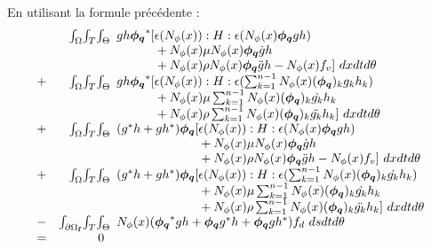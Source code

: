 En utilisant la formule précédente :
\begin{equation}
\begin{array}{r r l}
	&\int_\Omega \! \int_T \! \int_\Theta \!\!\!&		
		gh\boldsymbol{\phi_q}^*[\epsilon (N_\phi(x)) : H : \epsilon (N_\phi(x)\boldsymbol{\phi_q} gh)
			\\ && \phantom{gh\boldsymbol{\phi_q}^*[ }
			+ N_\phi(x) \mu  N_\phi(x) \boldsymbol{\phi_q}  \dot{g}h
			\\ && \phantom{gh\boldsymbol{\phi_q}^*[ }
			+ N_\phi(x) \rho N_\phi(x) \boldsymbol{\phi_q} \ddot{g}h
			- N_\phi(x) f_v
			] ~dx dt d\theta
	\\
	+ &\int_\Omega \! \int_T \! \int_\Theta \!\!\!&		
		gh\boldsymbol{\phi_q}^*[\epsilon (N_\phi(x)) : H : 
				\epsilon (\sum_{k=1}^{n-1} N_\phi(x)(\boldsymbol{\phi_q})_k g_k h_k)
			\\ && \phantom{gh\boldsymbol{\phi_q}^*[}
			+ N_\phi(x) \mu \sum_{k=1}^{n-1} N_\phi(x)(\boldsymbol{\phi_q})_k \dot{g_k} h_k 
			\\ && \phantom{gh\boldsymbol{\phi_q}^*[}
			+ N_\phi(x) \rho \sum_{k=1}^{n-1} N_\phi(x)(\boldsymbol{\phi_q})_k \ddot{g_k} h_k 
			] ~dx dt d\theta
	\\
	+ &\int_\Omega \! \int_T \! \int_\Theta \!\!\!&		
		(g^*h + gh^*)\boldsymbol{\phi_q}[\epsilon (N_\phi(x)) : H : \epsilon (N_\phi(x) \boldsymbol{\phi_q}gh)
			\\ && \phantom{(g^*h + gh^*)\boldsymbol{\phi_q}[ }
			+ N_\phi(x) \mu  N_\phi(x) \boldsymbol{\phi_q} \dot{g}h
			\\ && \phantom{(g^*h + gh^*)\boldsymbol{\phi_q}[ }
			 + N_\phi(x) \rho N_\phi(x) \boldsymbol{\phi_q} \ddot{g}h
			- N_\phi(x) f_v
			] ~dx dt d\theta
	\\
	+ &\int_\Omega \! \int_T \! \int_\Theta \!\!\!&
		(g^*h + gh^*)\boldsymbol{\phi_q}[\epsilon (N_\phi(x)) : H : 
					\epsilon (\sum_{k=1}^{n-1} N_\phi(x)(\boldsymbol{\phi_q})_k \dot{g_k} h_k )
			\\ && \phantom{(g^*h + gh^*)\boldsymbol{\phi_q}[}
			+ N_\phi(x) \mu \sum_{k=1}^{n-1} N_\phi(x)(\boldsymbol{\phi_q})_k \dot{g_k} h_k 
			\\ && \phantom{(g^*h + gh^*)\boldsymbol{\phi_q}[}
			+ N_\phi(x) \rho \sum_{k=1}^{n-1} N_\phi(x)(\boldsymbol{\phi_q})_k \ddot{g_k} h_k 
			] ~dx dt d\theta
	\\
	- &\int_{\partial \Omega_\mathbf{f}} \! \int_T \! \int_\Theta \!\!\!&
		N_\phi(x)(\boldsymbol{\phi_q}^*gh + \boldsymbol{\phi_q} g^*h + \boldsymbol{\phi_q} gh^*) f_d  ~ds dt d\theta
	\\
	= &0& 
\end{array}
\end{equation}

